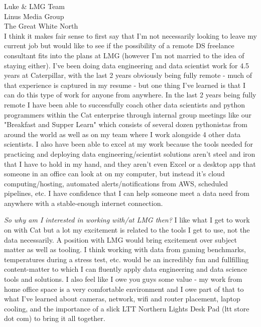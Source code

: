 \documentclass[11pt]{letter} %
\begin{document}
\begin{letter}{Luke \& LMG Team \\
Linus Media Group \\
The Great White North \\
}
I think it makes fair sense to first say that I'm not necessarily looking to leave my current job but would like to see if the possibility of a remote DS freelance consultant fits into the plans at LMG (however I'm not married to the idea of staying either).
I've been doing data engineering and data scientist work for 4.5 years at Caterpillar, with the last 2 years obviously being fully remote - much of that experience is captured in my resume - but one thing I've learned is that I can do this type of work for anyone from anywhere.
In the last 2 years being fully remote I have been able to successfully coach other data scientists and python programmers within the Cat enterprise through internal group meetings like our "Breakfast and Supper Learn" which consists of several dozen pythonistas from around the world as well as on my team where I work alongside 4 other data scientists. 
I also have been able to excel at my work because the tools needed for practicing and deploying data engineering/scientist solutions aren't steel and iron that I have to hold in my hand, and they aren't even Excel or a desktop app that someone in an office can look at on my computer, but instead it's cloud computing/hosting, automated alerts/notifications from AWS, scheduled pipelines, etc. I have confidence that I can help someone meet a data need from anywhere with a stable-enough internet connection.

\textit{So why am I interested in working with/at LMG then?}
I like what I get to work on with Cat but a lot my excitement is related to the tools I get to use, not the data necessarily.
A position with LMG would bring excitement over subject matter as well as tooling.
I think working with data from gaming benchmarks, temperatures during a stress test, etc. would be an incredibly fun and fullfilling content-matter to which I can fluently apply data engineering and data science tools and solutions.
I also feel like I owe you guys some value - my work from home office space is a very comfortable environment and I owe part of that to what I've learned about cameras, network, wifi and router placement, laptop cooling, and the importance of a slick LTT Northern Lights Desk Pad (ltt store dot com) to bring it all together.


\end{letter}
\end{document}
